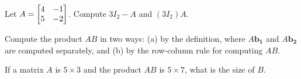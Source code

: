 \documentclass{../mathhomework}
\newcommand{\Vect}[1]{\pmb{#1}}
\newenvironment{Mat}{\begin{bmatrix}}{\end{bmatrix}}
\begin{document}
\begin{problem}[2.1\#3]
    Let $A = \begin{Mat}
        4 & -1 \\ 5 & -2
    \end{Mat}$. Compute $3I_2 - A$ and $(3I_2)A$.
\end{problem}

\begin{problem}[2.1\#5]
    Compute the product $AB$ in two ways: (a) by the definition, where $A\Vect{b_1}$ and $A\Vect{b_2}$ are computed separately, and (b) by the row-column rule for computing $AB$.
\end{problem}

\begin{problem}[2.1\#7]
    If a matrix $A$ is $5 \times 3$ and the product $AB$ is $5 \times 7$, what is the size of $B$.
\end{problem}

\begin{problem}[2.1\#9]\end{problem}

\begin{problem}[2.1\#13]\end{problem}

\begin{problem}[2.1\#15]\end{problem}

\begin{problem}[2.1\#21]\end{problem}

\begin{problem}[2.1\#27]\end{problem}



\begin{problem}[2.2\#1]\end{problem}

\begin{problem}[2.2\#5]\end{problem}

\begin{problem}[2.2\#7]\end{problem}

\begin{problem}[2.2\#9]\end{problem}

\begin{problem}[2.2\#13]\end{problem}

\begin{problem}[2.2\#15]\end{problem}

\begin{problem}[2.2\#17]\end{problem}

\begin{problem}[2.2\#19]\end{problem}

\begin{problem}[2.2\#21]\end{problem}

\begin{problem}[2.2\#31]\end{problem}
\end{document}

